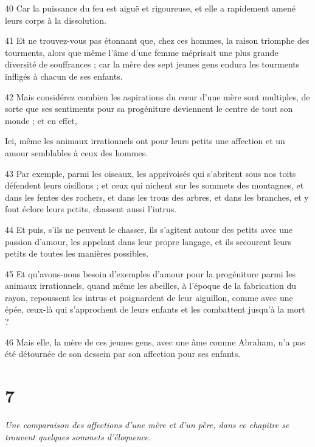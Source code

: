 \par 40 Car la puissance du feu est aiguë et rigoureuse, et elle a rapidement amené leurs corps à la dissolution.

\par 41 Et ne trouvez-vous pas étonnant que, chez ces hommes, la raison triomphe des tourments, alors que même l'âme d'une femme méprisait une plus grande diversité de souffrances ; car la mère des sept jeunes gens endura les tourments infligés à chacun de ses enfants.

\par 42 Mais considérez combien les aspirations du cœur d'une mère sont multiples, de sorte que ses sentiments pour sa progéniture deviennent le centre de tout son monde ; et en effet, \p

\par Ici, même les animaux irrationnels ont pour leurs petits une affection et un amour semblables à ceux des hommes.

\par 43 Par exemple, parmi les oiseaux, les apprivoisés qui s'abritent sous nos toits défendent leurs oisillons ; et ceux qui nichent sur les sommets des montagnes, et dans les fentes des rochers, et dans les trous des arbres, et dans les branches, et y font éclore leurs petits, chassent aussi l'intrus.

\par 44 Et puis, s'ils ne peuvent le chasser, ils s'agitent autour des petits avec une passion d'amour, les appelant dans leur propre langage, et ils secourent leurs petits de toutes les manières possibles.

\par 45 Et qu'avons-nous besoin d'exemples d'amour pour la progéniture parmi les animaux irrationnels, quand même les abeilles, à l'époque de la fabrication du rayon, repoussent les intrus et poignardent de leur aiguillon, comme avec une épée, ceux-là qui s'approchent de leurs enfants et les combattent jusqu'à la mort ?

\par 46 Mais elle, la mère de ces jeunes gens, avec une âme comme Abraham, n'a pas été détournée de son dessein par son affection pour ses enfants.

\chapter{7}

\par \textit{Une comparaison des affections d'une mère et d'un père, dans ce chapitre se trouvent quelques sommets d'éloquence.}


